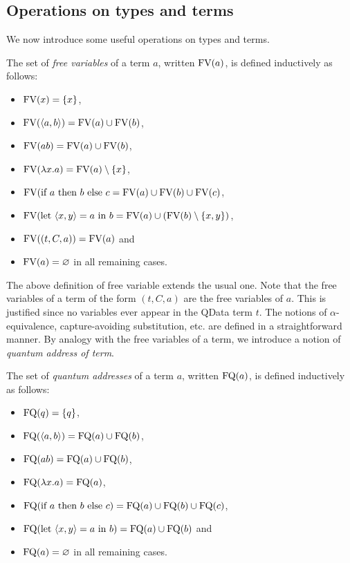 \documentclass[twoside]{article}
\begin{document}
\subsection{Operations on types and terms}

We now introduce some useful operations on types and terms. 

\begin{definition}
The set of \emph{free variables} of a term $a$, written $\FV(a)$, 
is defined inductively as follows:
\begin{itemize}
  \item $\FV(x)=\s{x}$,
  \item $\FV(\p{a,b})=\FV(a)\cup \FV(b)$,
  \item $\FV(ab)=\FV(a)\cup \FV(b)$,
  \item $\FV(\lambda x.a)=\FV(a)\setminus\s{x}$,
  \item $\FV(\ifthenelse{a}{b}{c} = \FV(a) \cup \FV(b) \cup \FV(c)$,
  \item $\FV(\letin{\p{x,y}}{a}{b}= \FV(a)\cup (\FV(b)\setminus \s{x,y})$,
  \item $\FV((t,C,a))= \FV(a)$ and
  \item $\FV(a)=\varnothing$ in all remaining cases.
\end{itemize}
\end{definition}

The above definition of free variable extends the usual one. Note 
that the free variables of a term of the form $(t,C,a)$ are the 
free variables of $a$. This is justified since no variables ever 
appear in the QData term $t$. The notions of $\alpha$-equivalence, 
capture-avoiding substitution, etc. are defined in a straightforward 
manner. By analogy with the free variables of a term, we introduce a 
notion of \emph{quantum address of term}.

\begin{definition}
The set of \emph{quantum addresses} of a term $a$, written $\FQ(a)$, is 
defined inductively as follows:
\begin{itemize}
  \item $\FQ(q)=\s{q}$,
  \item $\FQ(\p{a,b})=\FQ(a)\cup \FQ(b)$,
  \item $\FQ(ab)=\FQ(a)\cup \FQ(b)$,
  \item $\FQ(\lambda x.a)=\FQ(a)$,
  \item $\FQ(\ifthenelse{a}{b}{c}) = \FQ(a) \cup \FQ(b) \cup \FQ(c)$,
  \item $\FQ(\letin{\p{x,y}}{a}{b})= \FQ(a)\cup \FQ(b)$ and
  \item $\FQ(a)=\varnothing$ in all remaining cases.
\end{itemize}
\end{definition}
\end{document}
